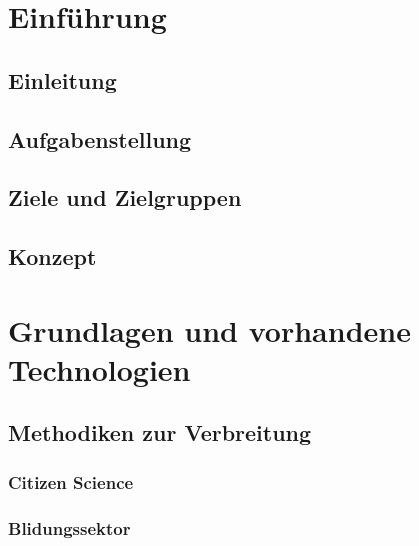 \documentclass[12pt]{article}
\begin{document}
\newpage %
\ofoot{\pagemark}

\section{Einf\"uhrung}
\label{sec:introduction}

\subsection{Einleitung}
%

\subsection{Aufgabenstellung}
%

\subsection{Ziele und Zielgruppen}
%

\subsection{Konzept}
%

\newpage %

\section{Grundlagen und vorhandene Technologien}
%

\newpage %
\subsection{Methodiken zur Verbreitung}
%
\newpage

\subsubsection{Citizen Science}
%

\newpage
\subsubsection{Blidungssektor}
%
\end{document}
